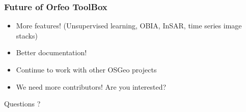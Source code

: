 \documentclass[smaller]{beamer}
\begin{document}
\begin{frame}
\frametitle{Future of Orfeo ToolBox}
\begin{itemize}
\item More features! (Unsupervised learning, OBIA, InSAR, time series image stacks)
\item Better documentation!
\item Continue to work with other OSGeo projects
\item We need more contributors! Are you interested?
\end{itemize}
\end{frame}


\begin{frame}{Questions ?}
\end{frame}
\end{document}
